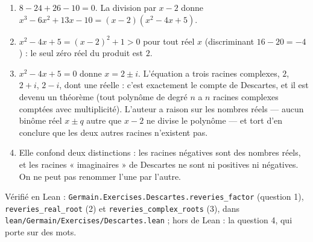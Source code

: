 \documentclass[11pt,a4paper]{article}
\begin{document}
\begin{solution}
\begin{enumerate}
\item $8 - 24 + 26 - 10 = 0$. La division par $x - 2$ donne
  $x^3 - 6x^2 + 13x - 10 = (x-2)(x^2 - 4x + 5)$.
\item $x^2 - 4x + 5 = (x-2)^2 + 1 > 0$ pour tout réel $x$ (discriminant
  $16 - 20 = -4$) : le seul zéro réel du produit est $2$.
\item $x^2 - 4x + 5 = 0$ donne $x = 2 \pm i$. L'équation a trois racines complexes,
  $2$, $2 + i$, $2 - i$, dont une réelle : c'est exactement le compte de Descartes,
  et il est devenu un théorème (tout polynôme de degré $n$ a $n$ racines complexes
  comptées avec multiplicité). L'auteur a raison sur les nombres réels --- aucun
  binôme réel $x \pm q$ autre que $x - 2$ ne divise le polynôme --- et tort d'en
  conclure que les deux autres racines n'existent pas.
\item Elle confond deux distinctions : les racines négatives sont des nombres
  réels, et les racines « imaginaires » de Descartes ne sont ni positives ni
  négatives. On ne peut pas renommer l'une par l'autre.
\end{enumerate}

Vérifié en Lean : \texttt{Germain.Exercises.Descartes.reveries\_factor} (question 1),
\texttt{reveries\_real\_root} (2) et \texttt{reveries\_complex\_roots} (3), dans
\texttt{lean/Germain/Exercises/Descartes.lean} ; hors de Lean : la question 4, qui porte sur des mots.
\end{solution}
\end{document}
